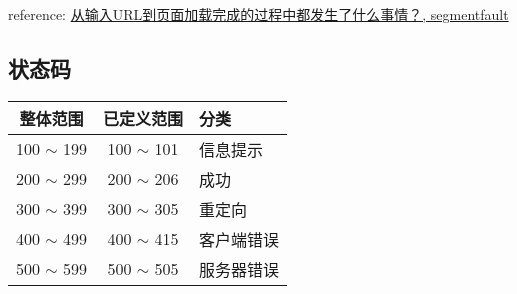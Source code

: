reference: \href{http://segmentfault.com/q/1010000000489803/a-1020000000489830}{从输入URL到页面加载完成的过程中都发生了什么事情？, segmentfault}

\subsection{状态码}\hypertarget{section-1}{}\label{section-1}

\begin{longtable}{|c|c|l|}   %
\hline
整体范围 & 已定义范围 & 分类\\
\hline
100 \ensuremath{\sim} 199 & 100 \ensuremath{\sim} 101 & 信息提示\\
200 \ensuremath{\sim} 299 & 200 \ensuremath{\sim} 206 & 成功\\
300 \ensuremath{\sim} 399 & 300 \ensuremath{\sim} 305 & 重定向\\
400 \ensuremath{\sim} 499 & 400 \ensuremath{\sim} 415 & 客户端错误\\
500 \ensuremath{\sim} 599 & 500 \ensuremath{\sim} 505 & 服务器错误\\
\hline
\end{longtable}   %


